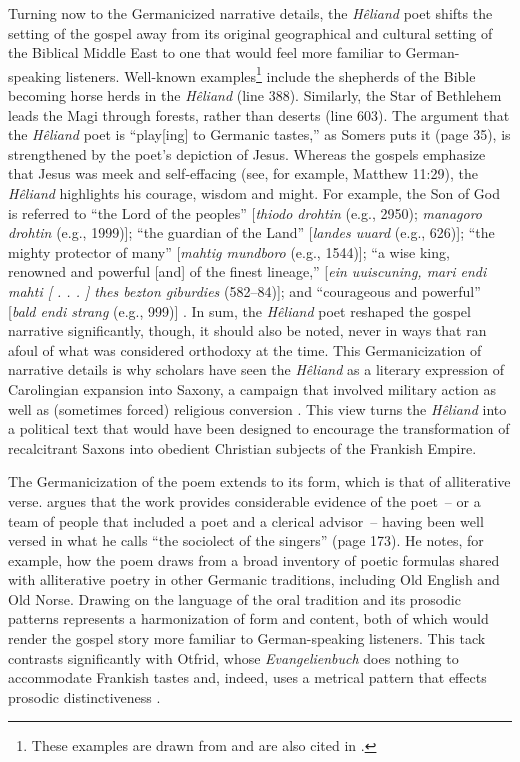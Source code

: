 Turning now to the Germanicized narrative details, the \textit{Hêliand} poet shifts the setting of the gospel away from its original geographical and cultural setting of the Biblical Middle East to one that would feel more familiar to German-speaking listeners. Well-known examples\footnote{\textrm{These examples are drawn from \citet[169--174]{Bostock1976} and are also cited in \citet[35]{Somers2021b}.} } include  the shepherds of the Bible becoming horse herds in the \textit{Hêliand} (line 388). Similarly, the Star of Bethlehem leads the Magi through forests, rather than deserts (line 603). The argument that the \textit{Hêliand} poet is “play[ing] to Germanic tastes,” as Somers puts it (page 35), is strengthened by the poet’s depiction of Jesus. Whereas the gospels emphasize that Jesus was meek and self-effacing (see, for example, Matthew 11:29), the \textit{Hêliand} highlights his courage, wisdom and might. For example, the Son of God is referred to “the Lord of the peoples” [\textit{thiodo drohtin} (e.g., 2950); \textit{managoro drohtin} (e.g., 1999)]; “the guardian of the Land” [\textit{landes uuard} (e.g., 626)]; “the mighty protector of many” [\textit{mahtig mundboro} (e.g., 1544)]; “a wise king, renowned and powerful [and] of the finest lineage,” [\textit{ein uuiscuning, mari endi mahti [ . . . ] thes bezton giburdies} (582–84)]; and  “courageous and powerful” [\textit{bald endi strang} (e.g., 999)] \citep[35; 47]{Somers2021b}. In sum, the \textit{Hêliand} poet reshaped the gospel narrative significantly, though, it should also be noted, never in ways that ran afoul of what was considered orthodoxy at the time. This Germanicization of narrative details is why scholars have seen the \textit{Hêliand} as a literary expression of Carolingian expansion into Saxony, a campaign that involved military action as well as (sometimes forced) religious conversion \citep[35]{Somers2021b}. This view turns the \textit{Hêliand} into a political text that would have been designed to encourage the transformation of recalcitrant Saxons into obedient Christian subjects of the Frankish Empire.

The Germanicization of the poem extends to its form, which is that of alliterative verse. \citet[170--174]{Haferland2010} argues that the work provides considerable evidence of the poet~-- or a team of people that included a poet and a clerical advisor~-- having been well versed in what he calls “the sociolect of the singers” (page 173). He notes, for example, how the poem draws from a broad inventory of poetic formulas shared with alliterative poetry in other Germanic traditions, including Old English and Old Norse. Drawing on the language of the oral tradition and its prosodic patterns represents a harmonization of form and content, both of which would render the gospel story more familiar to German-speaking listeners. This tack contrasts significantly with Otfrid, whose \textit{Evangelienbuch} does nothing to accommodate Frankish tastes and, indeed, uses a metrical pattern that effects prosodic distinctiveness \citep{Somers2021b}.

